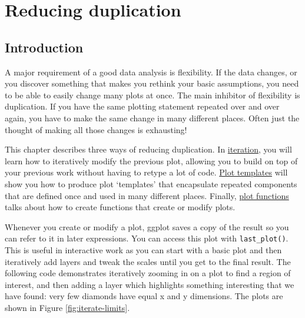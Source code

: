 \chapter{Reducing duplication}\label{cha:duplication}

\section{Introduction}

A major requirement of a good data analysis is flexibility. If the data
changes, or you discover something that makes you rethink your basic
assumptions, you need to be able to easily change many plots at once.
The main inhibitor of flexibility is duplication. If you have the same
plotting statement repeated over and over again, you have to make the
same change in many different places. Often just the thought of making
all those changes is exhausting!

This chapter describes three ways of reducing duplication. In
\hyperref[sec:iteration]{iteration}, you will learn how to iteratively
modify the previous plot, allowing you to build on top of your previous
work without having to retype a lot of code.
\hyperref[sec:templates]{Plot templates} will show you how to produce
plot `templates' that encapsulate repeated components that are defined
once and used in many different places. Finally,
\hyperref[sec:functions]{plot functions} talks about how to create
functions that create or modify plots. 


Whenever you create or modify a plot, ggplot saves a copy of the result
so you can refer to it in later expressions. You can access this plot
with \texttt{last\_plot()}. This is useful in interactive work as you
can start with a basic plot and then iteratively add layers and tweak
the scales until you get to the final result. The following code
demonstrates iteratively zooming in on a plot to find a region of
interest, and then adding a layer which highlights something interesting
that we have found: very few diamonds have equal x and y dimensions. The
plots are shown in Figure \ref{fig:iterate-limits}. 
 

